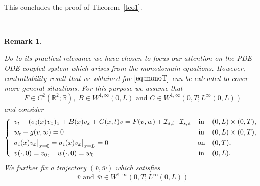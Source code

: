 \documentclass[10pt]{article}
\newtheorem{rmq}{Remark}
\def\dis{\displaystyle}
\def\\Phivec{\mathbf{\Phi}}
\begin{document}
	\
	
	This concludes the proof of Theorem~\ref{teo1}.

\

	\begin{rmq}\label{rmq_AA}{ Do to its practical relevance we have  chosen to focus our attention on the PDE-ODE coupled system which arises from the monodomain equations. However, controllability result that we obtained for $\eqref{eq:monoT}$ can be extended to cover more general situations. For this purpose we assume that
\begin{equation}\label{eq:kk1}
F\in C^2(\mathbb{R}^2;\mathbb{R}),\;  B\in W^{1,\infty}(0,L)  \text{ and  }C\in W^{1,\infty}(0,T;L^\infty(0,L))
\end{equation}
and consider
 	\[
    \left\{
        \begin{array}{lcl}
        v_t-(\sigma_i(x) v_x)_x+{ B(x)v_x+C(x,t)v}={ F(v,w)}+\mathcal{I}_{s,i}{-\mathcal{I}_{s,e}} &\mbox{in}&(0,L) \times (0,T),    \\
        \noalign{\smallskip}\dis
        w_t   +g(v,w)= 0 &\mbox{in}&(0,L) \times (0,T),    \\
        \noalign{\smallskip}\dis
        \sigma_i(x)v_x\big|_{x=0}=\sigma_i(x)v_x\big|_{x=L} = 0 &\mbox{on}&(0,T),            \\
        \noalign{\smallskip}\dis
        v(\cdot,0) =v_0,\quad w(\cdot,0) =w_0 &\mbox{in}&(0,L).
        \end{array}
    \right.
\] 
We further fix a {\it trajectory} $(\bar{v},\bar{w})$ which satisfies 
\begin{equation}\label{eq:kk2}
\bar v \text{ and } \bar w \in W^{1,\infty}(0,T;L^\infty(0,L))
\end{equation}

}
\end{rmq}
\end{document}
